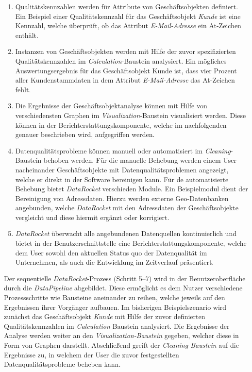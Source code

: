 \documentclass[
  language=german, %
  type=bachelor%
]{isthesis}
\begin{document}
\begin{content}
\begin{enumerate}
    \item Qualitätskennzahlen werden für Attribute von Geschäftsobjekten
      definiert. Ein Beispiel einer Qualitätskennzahl für das Geschäftsobjekt
      \textit{Kunde} ist eine Kennzahl, welche überprüft, ob das Attribut
      \textit{E-Mail-Adresse} ein At-Zeichen enthält.

    \item Instanzen von Geschäftsobjekten werden mit Hilfe der zuvor
      spezifizierten Qualitätskennzahlen im \textit{Calculation}-Baustein
      analysiert. Ein mögliches Auswertungsergebnis für das Geschäftsobjekt
      Kunde ist, dass vier Prozent aller Kundenstammdaten in dem Attribut
      \textit{E-Mail-Adresse} das At-Zeichen fehlt.

    \item Die Ergebnisse der Geschäftsobjektanalyse können mit Hilfe von
      verschiedensten Graphen im \textit{Visualization}-Baustein visualisiert
      werden. Diese können in der Berichterstattungskomponente, welche im
      nachfolgenden genauer beschrieben wird, aufgegriffen werden.

    \item Datenqualitätsprobleme können manuell oder automatisiert im
      \textit{Cleaning}-Baustein behoben werden. Für die manuelle Behebung
      werden einem User nacheinander Geschäftsobjekte mit
      Datenqualitätsproblemen angezeigt, welche er direkt in der Software
      bereinigen kann. Für de automatisierte Behebung bietet
      \textit{DataRocket} verschieden Module. Ein Beispielmodul dient der
      Bereinigung von Adressdaten. Hierzu werden externe
      Geo-Datenbanken  angebunden, welche
      \textit{DataRocket} mit den Adressdaten der Geschäftsobjekte vergleicht
      und diese hiermit \ggf{} ergänzt oder korrigiert.

    \item \textit{DataRocket} überwacht alle angebundenen Datenquellen
      kontinuierlich und bietet in der Benutzerschnittstelle eine
      Berichterstattungskomponente, welche dem User sowohl den aktuellen Status
      quo der Datenqualität im Unternehmen, als auch die Entwicklung im
      Zeitverlauf präsentiert.
	\end{enumerate}

    Der sequentielle \textit{DataRocket}-Prozess (Schritt 5--7) wird in der
    Benutzeroberfläche durch die \textit{DataPipeline}
    abgebildet. Diese ermöglicht es
    dem Nutzer verschiedene Prozessschritte wie Bausteine aneinander zu reihen,
    welche jeweils auf den Ergebnissen ihrer Vorgänger aufbauen. Im bisherigen
    Beispielszenario wird zunächst das Geschäftsobjekt \textit{Kunde} mit Hilfe
    der zuvor definierten Qualitätskennzahlen im \textit{Calculation} Baustein
    analysiert. Die Ergebnisse der Analyse werden weiter an den
    \textit{Visualization-Baustein} gegeben, welcher diese in Form von Graphen
    darstellt. Abschließend greift der \textit{Cleaning-Baustein} auf die
    Ergebnisse zu, in welchem der User die zuvor festgestellten
    Datenqualitätsprobleme beheben kann.


\end{content}
\end{document}
